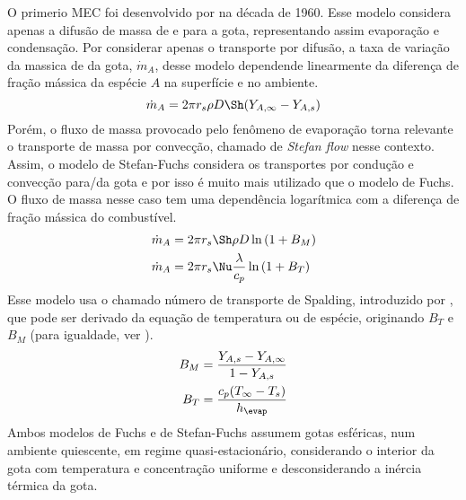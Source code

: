 
O primerio MEC foi desenvolvido por  na década de 1960. 
Esse modelo considera apenas a difusão de massa de e para a gota, representando assim evaporação e condensação.
Por considerar apenas o transporte por difusão, a taxa de variação da  massica de da gota, $\dot m_A$, desse modelo dependende linearmente da diferença de fração mássica da espécie $A$ na superfície e no ambiente.
\begin{equation}
    \dot m_A = 2 \pi r_s \rho D \Sh (Y_{A,\infty} - Y_{A,s}) \label{eq:maxwell}
\end{equation}
Porém, o fluxo de massa provocado pelo fenômeno de evaporação torna relevante o transporte de massa por convecção, chamado de \emph{Stefan flow} nesse contexto. 
Assim, o modelo de Stefan-Fuchs considera os transportes por condução e convecção para/da gota e por isso é muito mais utilizado que o modelo de Fuchs.
O fluxo de massa nesse caso tem uma dependência logarítmica com a diferença de fração mássica do combustível. 
\begin{align}
    \dot m_{A} &= 2 \pi r_s \Sh \rho D \ln{(1 + B_M)}              \label{eq:m_evap_BM} \\
    \dot m_A   &= 2 \pi r_s \Nu \frac{\lambda}{c_p} \ln{(1 + B_T)} \label{eq:m_evap_BT}
\end{align}
Esse modelo usa o chamado número de transporte de Spalding, introduzido por , que pode ser derivado da equação de temperatura ou de espécie, originando $B_T$ e $B_M$ (para igualdade, ver ).
\begin{align}
    B_M &= \frac{Y_{A,s} - Y_{A,\infty}}{1 - Y_{A,s}} \label{eq:B_M} \\
    B_T &= \frac{c_p (T_\infty - T_s)}{h_\evap}       \label{eq:B_T}
\end{align} 
Ambos modelos de Fuchs e de Stefan-Fuchs assumem gotas esféricas, num ambiente quiescente, em regime quasi-estacionário, considerando o interior da gota com temperatura e concentração uniforme e desconsiderando a inércia térmica da gota. 

